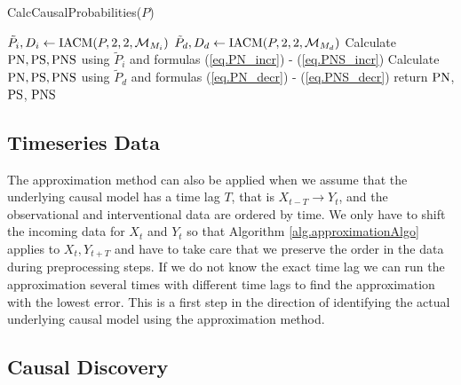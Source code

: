 \documentclass[letterpaper]{article}
\newcommand{\kM}{\mathcal{M}}   %
\newcommand{\PN}{{\rm PN}}
\newcommand{\PS}{{\rm PS}}
\newcommand{\PNS}{{\rm PNS}}
\begin{document}
\begin{algorithm}
\caption{CalcCausalProbabilities($P$)}
\label{alg.CalcCausalProbabilities}
\begin{algorithmic}[1]
\State $\tilde P_{i},  D_{i} \gets {\rm IACM}(P, 2, 2, \kM_{M_i})$
\State $\tilde P_{d},  D_{d} \gets {\rm IACM}(P, 2, 2, \kM_{M_d})$
	\State Calculate $\PN, \PS, \PNS$ using $\tilde P_i$ and formulas (\ref{eq.PN_incr}) - (\ref{eq.PNS_incr})
\Else
	\State Calculate $\PN, \PS, \PNS$ using $\tilde P_d$ and formulas (\ref{eq.PN_decr}) - (\ref{eq.PNS_decr})
\EndIf
\State return $\PN$, $\PS$, $\PNS$
\end{algorithmic}
\end{algorithm}

\subsection{Timeseries Data}

The approximation method can also be applied when we assume that the underlying causal model has a time lag $T$, that is $X_{t-T} \rightarrow Y_t$, and the observational and interventional data are ordered by time. We only have to shift the incoming data for $X_t$ and $Y_t$ so that Algorithm \ref{alg.approximationAlgo} applies to $X_{t}, Y_{t+T}$ and have to take care that we preserve the order in the data during preprocessing steps. If we do not know the exact time lag we can run the approximation several times with different time lags to find the approximation with the lowest error. This is a first step in the direction of identifying the actual underlying causal model using the approximation method.

\subsection{Causal Discovery}
\end{document}
